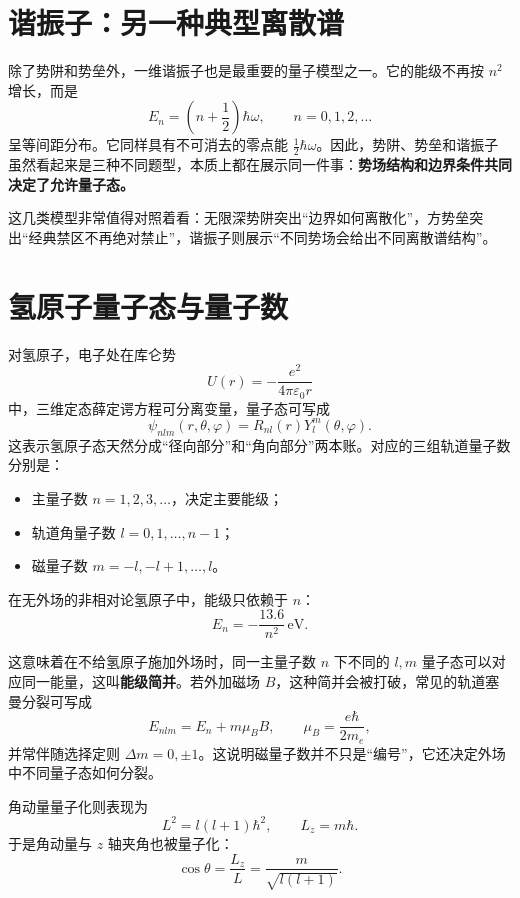 \documentclass[lang=cn,11pt]{elegantbook}
\begin{document}
\section{谐振子：另一种典型离散谱}

除了势阱和势垒外，一维谐振子也是最重要的量子模型之一。它的能级不再按 \(n^2\) 增长，而是
\[
E_n=\left(n+\frac12\right)\hbar\omega,
\qquad n=0,1,2,\dots
\]
呈等间距分布。它同样具有不可消去的零点能 \(\frac12\hbar\omega\)。因此，势阱、势垒和谐振子虽然看起来是三种不同题型，本质上都在展示同一件事：\textbf{势场结构和边界条件共同决定了允许量子态。}

\begin{remark}
这几类模型非常值得对照着看：无限深势阱突出“边界如何离散化”，方势垒突出“经典禁区不再绝对禁止”，谐振子则展示“不同势场会给出不同离散谱结构”。
\end{remark}

\section{氢原子量子态与量子数}

对氢原子，电子处在库仑势
\[
U(r)=-\frac{e^2}{4\pi\varepsilon_0 r}
\]
中，三维定态薛定谔方程可分离变量，量子态可写成
\[
\psi_{nlm}(r,\theta,\varphi)=R_{nl}(r)Y_l^m(\theta,\varphi).
\]
这表示氢原子态天然分成“径向部分”和“角向部分”两本账。对应的三组轨道量子数分别是：
\begin{itemize}
  \item 主量子数 \(n=1,2,3,\dots\)，决定主要能级；
  \item 轨道角量子数 \(l=0,1,\dots,n-1\)；
  \item 磁量子数 \(m=-l,-l+1,\dots,l\)。
\end{itemize}

在无外场的非相对论氢原子中，能级只依赖于 \(n\)：
\[
E_n=-\frac{13.6}{n^2}\,\mathrm{eV}.
\]

\begin{remark}
这意味着在不给氢原子施加外场时，同一主量子数 \(n\) 下不同的 \(l,m\) 量子态可以对应同一能量，这叫\textbf{能级简并}。若外加磁场 \(B\)，这种简并会被打破，常见的轨道塞曼分裂可写成
\[
E_{nlm}=E_n+m\mu_B B,
\qquad
\mu_B=\frac{e\hbar}{2m_e},
\]
并常伴随选择定则 \(\Delta m=0,\pm1\)。这说明磁量子数并不只是“编号”，它还决定外场中不同量子态如何分裂。
\end{remark}

角动量量子化则表现为
\[
L^2=l(l+1)\hbar^2,
\qquad
L_z=m\hbar.
\]
于是角动量与 \(z\) 轴夹角也被量子化：
\[
\cos\theta=\frac{L_z}{L}=\frac{m}{\sqrt{l(l+1)}}.
\]
\end{document}
